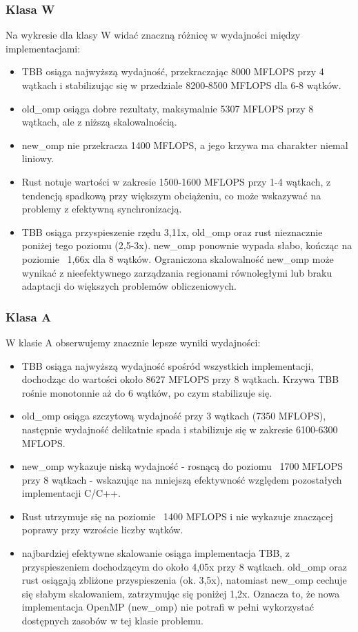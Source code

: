 \subsubsection{Klasa W}
Na wykresie dla klasy W widać znaczną różnicę w wydajności między implementacjami:
\begin{itemize}
    \item TBB osiąga najwyższą wydajność, przekraczając 8000 MFLOPS przy 4 wątkach i stabilizując się w przedziale 8200-8500 MFLOPS dla 6-8 wątków.
    \item old\_omp osiąga dobre rezultaty, maksymalnie 5307 MFLOPS przy 8 wątkach, ale z niższą skalowalnością.
    \item new\_omp nie przekracza 1400 MFLOPS, a jego krzywa ma charakter niemal liniowy.
    \item Rust notuje wartości w zakresie 1500-1600 MFLOPS przy 1-4 wątkach, z tendencją spadkową przy większym obciążeniu, co może wskazywać na problemy z efektywną synchronizacją.
    \item TBB osiąga przyspieszenie rzędu 3,11x, old\_omp oraz rust nieznacznie poniżej tego poziomu (2,5-3x). new\_omp ponownie wypada słabo, kończąc na poziomie ~1,66x dla 8 wątków. Ograniczona skalowalność new\_omp może wynikać z nieefektywnego zarządzania regionami równoległymi lub braku adaptacji do większych problemów obliczeniowych.
\end{itemize}


\subsubsection{Klasa A}
W klasie A obserwujemy znacznie lepsze wyniki wydajności:
\begin{itemize}
    \item TBB osiąga najwyższą wydajność spośród wszystkich implementacji, dochodząc do wartości około 8627 MFLOPS przy 8 wątkach. Krzywa TBB rośnie monotonnie aż do 6 wątków, po czym stabilizuje się.
    \item old\_omp osiąga szczytową wydajność przy 3 wątkach (7350 MFLOPS), następnie wydajność delikatnie spada i stabilizuje się w zakresie 6100-6300 MFLOPS.
    \item new\_omp wykazuje niską wydajność - rosnącą do poziomu ~1700 MFLOPS przy 8 wątkach - wskazując na mniejszą efektywność względem pozostałych implementacji C/C++.
    \item Rust utrzymuje się na poziomie ~1400 MFLOPS i nie wykazuje znaczącej poprawy przy wzroście liczby wątków.
    \item najbardziej efektywne skalowanie osiąga implementacja TBB, z przyspieszeniem dochodzącym do około 4,05x przy 8 wątkach. old\_omp oraz rust osiągają zbliżone przyspieszenia (ok. 3,5x), natomiast new\_omp cechuje się słabym skalowaniem, zatrzymując się poniżej 1,2x. Oznacza to, że nowa implementacja OpenMP (new\_omp) nie potrafi w pełni wykorzystać dostępnych zasobów w tej klasie problemu.
\end{itemize}

